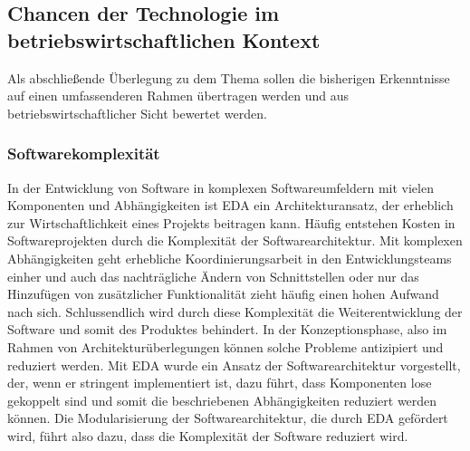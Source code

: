 \subsection{Chancen der Technologie im betriebswirtschaftlichen Kontext}
Als abschließende Überlegung zu dem Thema sollen die bisherigen Erkenntnisse auf einen umfassenderen Rahmen übertragen werden und aus betriebswirtschaftlicher Sicht bewertet werden.
\subsubsection*{Softwarekomplexität}
In der Entwicklung von Software in komplexen Softwareumfeldern mit vielen Komponenten und Abhängigkeiten ist \ac{EDA} ein Architekturansatz, der erheblich zur Wirtschaftlichkeit eines Projekts beitragen kann. Häufig entstehen Kosten in Softwareprojekten durch die Komplexität der Softwarearchitektur. Mit komplexen Abhängigkeiten geht erhebliche Koordinierungsarbeit in den Entwicklungsteams einher und auch das nachträgliche Ändern von Schnittstellen oder nur das Hinzufügen von zusätzlicher Funktionalität zieht häufig einen hohen Aufwand nach sich. Schlussendlich wird durch diese Komplexität die Weiterentwicklung der Software und somit des Produktes behindert.
In der Konzeptionsphase, also im Rahmen von Architekturüberlegungen können solche Probleme antizipiert und reduziert werden. Mit \ac{EDA} wurde ein Ansatz der Softwarearchitektur vorgestellt, der, wenn er stringent implementiert ist, dazu führt, dass Komponenten lose gekoppelt sind und somit die beschriebenen Abhängigkeiten reduziert werden können. Die Modularisierung der Softwarearchitektur, die durch \ac{EDA} gefördert wird, führt also dazu, dass die Komplexität der Software reduziert wird.
